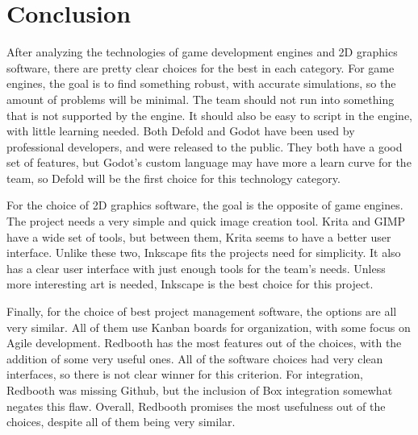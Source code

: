 \documentclass[capstone.tex]{subfiles}
\begin{document}
\section{Conclusion}
After analyzing the technologies of game development engines and 2D graphics software, there are pretty clear choices for the best in each category. For game engines, the goal is to find something robust, with accurate simulations, so the amount of problems will be minimal. The team should not run into something that is not supported by the engine. It should also be easy to script in the engine, with little learning needed. Both Defold and Godot have been used by professional developers, and were released to the public. They both have a good set of features, but Godot’s custom language may have more a learn curve for the team, so Defold will be the first choice for this technology category.

For the choice of 2D graphics software, the goal is the opposite of game engines. The project needs a very simple and quick image creation tool. Krita and GIMP have a wide set of tools, but between them, Krita seems to have a better user interface. Unlike these two, Inkscape fits the projects need for simplicity. It also has a clear user interface with just enough tools for the team’s needs. Unless more interesting art is needed, Inkscape is the best choice for this project.

Finally, for the choice of best project management software, the options are all very similar. All of them use Kanban boards for organization, with some focus on Agile development. Redbooth has the most features out of the choices, with the addition of some very useful ones. All of the software choices had very clean interfaces, so there is not clear winner for this criterion. For integration, Redbooth was missing Github, but the inclusion of Box integration somewhat negates this flaw. Overall, Redbooth promises the most usefulness out of the choices, despite all of them being very similar.
\end{document}
